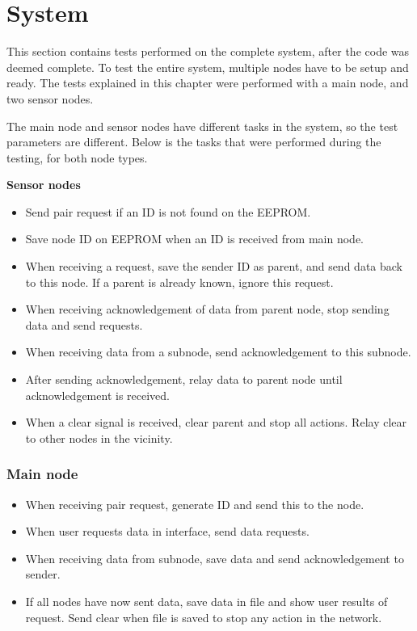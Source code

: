 \section{System}
This section contains tests performed on the complete system, after the code was deemed complete. To test the entire system, multiple nodes have to be setup and ready. The tests explained in this chapter were performed with a main node, and two sensor nodes. 

The main node and sensor nodes have different tasks in the system, so the test parameters are different. Below is the tasks that were performed during the testing, for both node types. 

\textbf{Sensor nodes} \\
\begin{itemize}
\item Send pair request if an ID is not found on the EEPROM.
\item Save node ID on EEPROM when an ID is received from main node.
\item When receiving a request, save the sender ID as parent, and send data back to this node. If a parent is already known, ignore this request.
\item When receiving acknowledgement of data from parent node, stop sending data and send requests. 
\item When receiving data from a subnode, send acknowledgement to this subnode.
\item After sending acknowledgement, relay data to parent node until acknowledgement is received.
\item When a clear signal is received, clear parent and stop all actions. Relay clear to other nodes in the vicinity.
\end{itemize}


\subsubsection*{Main node}
\begin{itemize}
\item When receiving pair request, generate ID and send this to the node.
\item When user requests data in interface, send data requests.
\item When receiving data from subnode, save data and send acknowledgement to sender.
\item If all nodes have now sent data, save data in file and show user results of request. Send clear when file is saved to stop any action in the network.
\end{itemize}

